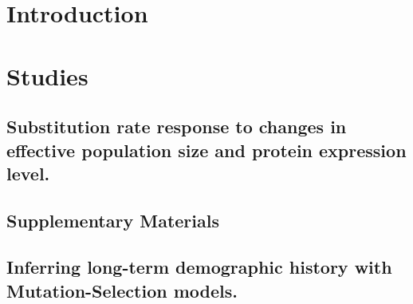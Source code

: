 \documentclass[a4paper,oneside,nobind]{thesis}
\begin{document}
%
\hypersetup{pageanchor=true}
\begin{romanpages}
\dominitoc %
\flushbottom
{
	\setlength{\baselineskip}{\frontmatterbaselineskip}
	\hypersetup{linkcolor=GREYDARK}
	\tableofcontents
	\listoffigures
	\mtcaddchapter
	\listoftables
	\mtcaddchapter
}
{
	\setlength{\baselineskip}{\frontmatterbaselineskip}
	
}

\end{romanpages}

\flushbottom


\pagestyle{fancybook}

\part{Introduction}
\setlength{\baselineskip}{1.5\frontmatterbaselineskip}

\label{part:intro}





\part{Studies}
\label{part:studies}


\chapter[Substitution rate susceptibility]{Substitution rate response to changes in effective population size and protein expression level.}
{\hypersetup{linkcolor=GREYDARK}\minitoc}


\chapter{Supplementary Materials}
{\hypersetup{linkcolor=GREYDARK}\minitoc}


\chapter[Inferring long-term population size] {Inferring long-term demographic history with Mutation-Selection models.}
{\hypersetup{linkcolor=GREYDARK}\minitoc}

\end{document}
